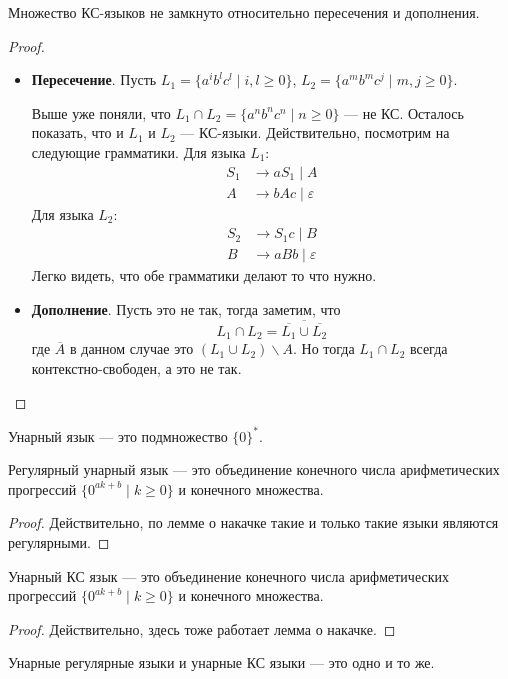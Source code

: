 \begin{theorem}
  Множество КС-языков не замкнуто относительно пересечения и дополнения.
\end{theorem}
\begin{proof} \quad
  \begin{itemize}
    \item \textbf{Пересечение}. Пусть $L_1 = \{a^i b^l c^l \; | \; i, l \geq 0\}$, $L_2  = \{a^m b^m c^j \; | \; m, j \geq 0\}$. 

    Выше уже поняли, что $L_1 \cap L_2 = \{a^n b^n c^n \; | \; n \geq 0\}$ --- не КС. Осталось показать, что и $L_1$ и $L_2$ --- КС-языки. Действительно, посмотрим на следующие грамматики. Для языка $L_1$:
     \begin{align*}
       S_1 &\to aS_1 \; | \; A \\
       A &\to bAc \; | \; \varepsilon
     \end{align*}
     Для языка $L_2$:
     \begin{align*}
       S_2 &\to S_1c \; | \; B \\
       B &\to aBb \; | \; \varepsilon
     \end{align*}
     Легко видеть, что обе грамматики делают то что нужно.
    \item \textbf{Дополнение}. Пусть это не так, тогда заметим, что
    \begin{equation*}
      L_1 \cap L_2 = \overline{\overline{L_1} \cup \overline{L_2}}
    \end{equation*}
    где $\overline{A}$ в данном случае это $(L_1 \cup L_2) \backslash A$. Но тогда $L_1 \cap L_2$ всегда контекстно-свободен, а это не так.
  \end{itemize}
\end{proof}

\begin{conj}
  Унарный язык --- это подмножество $\{0\}^{*}$.
\end{conj}
\begin{theorem}
  Регулярный унарный язык --- это объединение конечного числа арифметических прогрессий $\{0^{ak + b} \; | \; k \geq 0\}$ и конечного множества.
\end{theorem}
\begin{proof}
  Действительно, по лемме о накачке такие и только такие языки являются регулярными.
\end{proof}
\begin{theorem}
  Унарный КС язык --- это объединение конечного числа арифметических прогрессий $\{0^{ak + b} \; | \; k \geq 0\}$ и конечного множества.
\end{theorem}
\begin{proof}
  Действительно, здесь тоже работает лемма о накачке.
\end{proof}
\begin{follow}
  Унарные регулярные языки и унарные КС языки --- это одно и то же.
\end{follow}

